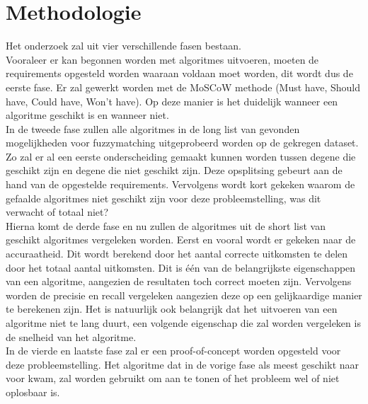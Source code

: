 

\section{Methodologie}%
\label{sec:methodologie}

Het onderzoek zal uit vier verschillende fasen bestaan.
\\\indent
Vooraleer er kan begonnen worden met algoritmes uitvoeren, moeten de requirements opgesteld worden waaraan voldaan moet worden, dit wordt dus de eerste fase. Er zal gewerkt worden met de MoSCoW methode (Must have, Should have, Could have, Won't have). Op deze manier is het duidelijk wanneer een algoritme geschikt is en wanneer niet.
\\\indent
In de tweede fase zullen alle algoritmes in de long list van gevonden mogelijkheden voor fuzzymatching uitgeprobeerd worden op de gekregen dataset. Zo zal er al een eerste onderscheiding gemaakt kunnen worden tussen degene die geschikt zijn en degene die niet geschikt zijn. Deze opsplitsing gebeurt aan de hand van de opgestelde requirements. Vervolgens wordt kort gekeken waarom de gefaalde algoritmes niet geschikt zijn voor deze probleemstelling, was dit verwacht of totaal niet?
\\\indent
Hierna komt de derde fase en nu zullen de algoritmes uit de short list van geschikt algoritmes vergeleken worden. Eerst en vooral wordt er gekeken naar de accuraatheid. Dit wordt berekend door het aantal correcte uitkomsten te delen door het totaal aantal uitkomsten. Dit is één van de belangrijkste eigenschappen van een algoritme, aangezien de resultaten toch correct moeten zijn. Vervolgens worden de precisie en recall vergeleken aangezien deze op een gelijkaardige manier te berekenen zijn. Het is natuurlijk ook belangrijk dat het uitvoeren van een algoritme niet te lang duurt, een volgende eigenschap die zal worden vergeleken is de snelheid van het algoritme.
\\\indent
In de vierde en laatste fase zal er een proof-of-concept worden opgesteld voor deze probleemstelling. Het algoritme dat in de vorige fase als meest geschikt naar voor kwam, zal worden gebruikt om aan te tonen of het probleem wel of niet oplosbaar is.






